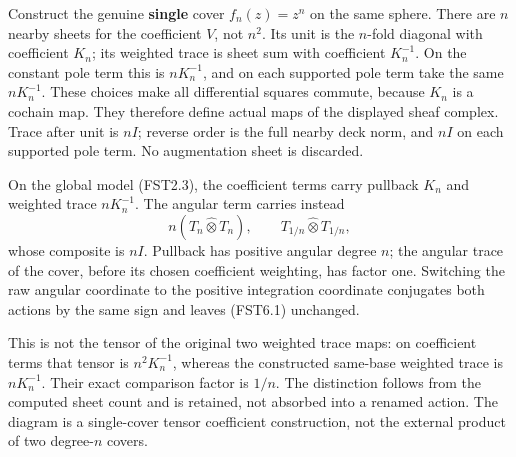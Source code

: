 Construct the genuine \textbf{single} cover \(f_n(z)=z^n\) on the same
sphere. There are \(n\) nearby sheets for the coefficient \(V\), not
\(n^2\). Its unit is the \(n\)-fold diagonal with coefficient \(K_n\);
its weighted trace is sheet sum with coefficient \(K_n^{-1}\). On the
constant pole term this is \(nK_n^{-1}\), and on each supported pole
term take the same \(nK_n^{-1}\). These choices make all differential
squares commute, because \(K_n\) is a cochain map. They therefore define
actual maps of the displayed sheaf complex. Trace after unit is \(nI\);
reverse order is the full nearby deck norm, and \(nI\) on each supported
pole term. No augmentation sheet is discarded.

On the global model (FST2.3), the coefficient terms carry pullback
\(K_n\) and weighted trace \(nK_n^{-1}\). The angular term carries
instead \[
n(T_n\widehat\otimes T_n),\qquad
T_{1/n}\widehat\otimes T_{1/n},
\tag{FST6.1}
\] whose composite is \(nI\). Pullback has positive angular degree
\(n\); the angular trace of the cover, before its chosen coefficient
weighting, has factor one. Switching the raw angular coordinate to the
positive integration coordinate conjugates both actions by the same sign
and leaves (FST6.1) unchanged.

This is not the tensor of the original two weighted trace maps: on
coefficient terms that tensor is \(n^2K_n^{-1}\), whereas the
constructed same-base weighted trace is \(nK_n^{-1}\). Their exact
comparison factor is \(1/n\). The distinction follows from the computed
sheet count and is retained, not absorbed into a renamed action. The
diagram is a single-cover tensor coefficient construction, not the
external product of two degree-\(n\) covers.

